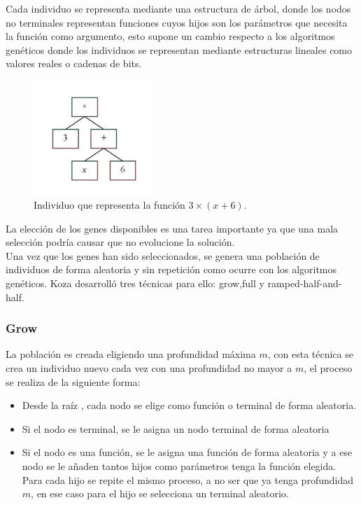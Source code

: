 \documentclass[12pt]{article} \usepackage[utf8x]{inputenc}
\begin{document}
Cada individuo se representa mediante una estructura de árbol, donde
los nodos no terminales representan funciones cuyos hijos son los
parámetros que necesita la función como argumento, esto supone un
cambio respecto a los algoritmos genéticos donde los individuos se
representan mediante estructuras lineales como valores reales o
cadenas de bits.

\begin{figure}[H]
  \centering
  \includegraphics[width=0.4\textwidth]{individuo.PNG}
  \caption{Individuo que representa la función \(3\times(x+6)\).}
  \label{fig:dfd:1}
\end{figure}


La elección de los genes disponibles es una tarea importante
ya que una mala selección podría causar que no evolucione
la solución.\\

Una vez que los genes han sido seleccionados, se genera una
población de individuos de forma aleatoria y sin repetición
como ocurre con los algoritmos genéticos. Koza desarrolló
tres técnicas para ello: grow,full y ramped-half-and-half.


\subsubsection{Grow}

La población es creada eligiendo una profundidad máxima \(m\),
con esta técnica se crea un individuo nuevo cada vez con una
profundidad no mayor a \(m\),
el proceso se realiza de la siguiente forma:
\begin{itemize}
\item Desde la raíz , cada nodo se elige como función o terminal de
  forma aleatoria.
\item Si el nodo es terminal, se le asigna un nodo terminal de forma
  aleatoria
\item Si el nodo es una función, se le asigna una función de forma
  aleatoria y a ese nodo se le añaden tantos hijos como parámetros
  tenga la función elegida. Para cada hijo se repite el mismo proceso,
  a no ser que ya tenga profundidad \(m\),
  en ese caso para el hijo se selecciona un terminal aleatorio.
\end{itemize}
\end{document}
